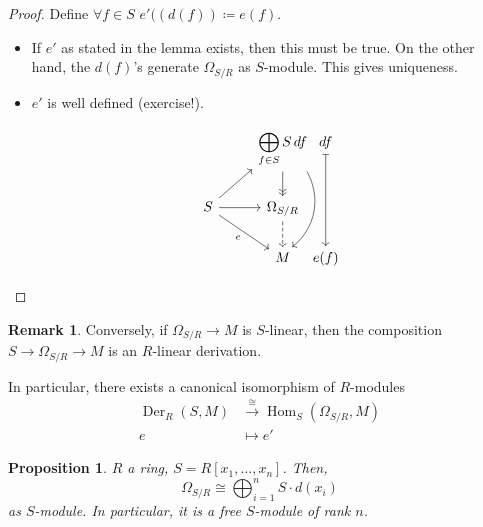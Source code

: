 \documentclass[12pt]{article}
\DeclareMathOperator{\Hom}{Hom}
\DeclareMathOperator{\Der}{Der}
\newtheorem*{proposition}{Proposition}
\theoremstyle{definition}
\newtheorem*{remark}{Remark}
\theoremstyle{remark}
\begin{document}
\begin{proof}
Define $\forall f\in S$ $e'((d(f))\coloneqq e(f)$.

\begin{itemize}[label=$-$]
\item If $e'$ as stated in the lemma exists, then this must be true. On the other hand, the $d(f)$'s generate $\Omega_{S/R}$ as $S$-module. This gives uniqueness.

\item $e'$ is well defined (exercise!).

\[
\begin{tikzcd}
&\displaystyle{\bigoplus_{f\in S}S\,df}\arrow[->>,d]\arrow[dd,bend left=40,looseness=1]&[-1cm]df\arrow[|->,dd]\\
S\arrow[ru]\arrow[r]\arrow[rd,"e",swap]&\Omega_{S/R}\arrow[d,dashed]\\
&M&e(f)
\end{tikzcd}
\]
\end{itemize}
\end{proof}

\begin{remark}
Conversely, if $\Omega_{S/R}\rightarrow M$ is $S$-linear, then the composition $S\rightarrow\Omega_{S/R}\rightarrow M$ is an $R$-linear derivation.

In particular, there exists a canonical isomorphism of $R$-modules
\begin{align*}
\Der_R(S,M)&\overset{\cong}{\longrightarrow}\Hom_S(\Omega_{S/R},M)\\
e&\longmapsto e'
\end{align*}
\end{remark}

\begin{proposition}
$R$ a ring, $S=R[x_1,\ldots,x_n]$. Then,
\[\Omega_{S/R}\cong\bigoplus_{i=1}^nS\cdot d(x_i)\]
as $S$-module. In particular, it is a free $S$-module of rank $n$.
\end{proposition}
\end{document}
